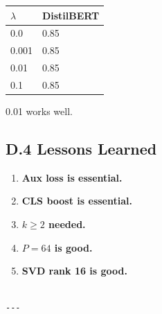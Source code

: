 \begin{table}[H]
\centering
\small
\begin{tabular}{ll}
\toprule
\textbf{$\lambda$} & \textbf{DistilBERT} \\
\midrule
0.0 & 0.85 \\
0.001 & 0.85 \\
0.01 & 0.85 \\
0.1 & 0.85 \\
\bottomrule
\end{tabular}
\end{table}

0.01 works well.

\subsection{D.4 Lessons Learned}

\begin{enumerate}
\item \textbf{Aux loss is essential.}
\item \textbf{CLS boost is essential.}
\item \textbf{$k \geq 2$ needed.}
\item \textbf{$P = 64$ is good.}
\item \textbf{SVD rank 16 is good.}
\end{enumerate}
\begin{lstlisting}

---
\end{lstlisting}